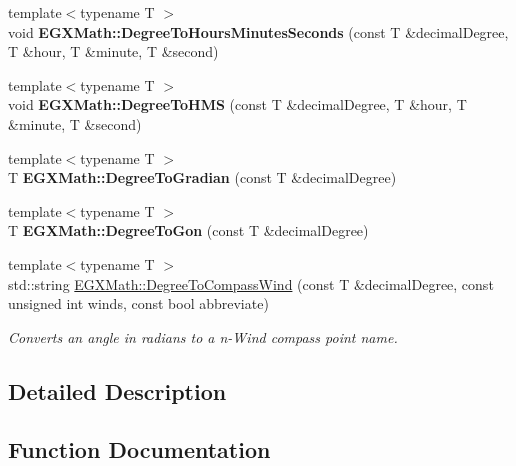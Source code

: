 \begin{DoxyCompactItemize}
{\footnotesize template$<$typename T $>$ }\\void {\bfseries E\+G\+X\+Math\+::\+Degree\+To\+Hours\+Minutes\+Seconds} (const T \&decimal\+Degree, T \&hour, T \&minute, T \&second)
\item 
\mbox{\label{group___e_g_x_math-_angle_conversions-_degree_ga0bb223ca6e77b00439a6d910ab32d82e}} 
{\footnotesize template$<$typename T $>$ }\\void {\bfseries E\+G\+X\+Math\+::\+Degree\+To\+H\+MS} (const T \&decimal\+Degree, T \&hour, T \&minute, T \&second)
\item 
\mbox{\label{group___e_g_x_math-_angle_conversions-_degree_ga25bb5506b3f66fff7a1b85bf7bd795b3}} 
{\footnotesize template$<$typename T $>$ }\\T {\bfseries E\+G\+X\+Math\+::\+Degree\+To\+Gradian} (const T \&decimal\+Degree)
\item 
\mbox{\label{group___e_g_x_math-_angle_conversions-_degree_ga87c3fab0867021e5d2501197b4db6194}} 
{\footnotesize template$<$typename T $>$ }\\T {\bfseries E\+G\+X\+Math\+::\+Degree\+To\+Gon} (const T \&decimal\+Degree)
\item 
{\footnotesize template$<$typename T $>$ }\\std\+::string \mbox{\hyperlink{group___e_g_x_math-_angle_conversions-_degree_ga5ffef873bcec300ab90570ad6e7b1ab1}{E\+G\+X\+Math\+::\+Degree\+To\+Compass\+Wind}} (const T \&decimal\+Degree, const unsigned int winds, const bool abbreviate)
\begin{DoxyCompactList}\small\item\em Converts an angle in radians to a n-\/\+Wind compass point name. \end{DoxyCompactList}\end{DoxyCompactItemize}


\subsection{Detailed Description}


\subsection{Function Documentation}
\mbox{\label{group___e_g_x_math-_angle_conversions-_degree_ga5ffef873bcec300ab90570ad6e7b1ab1}} 

